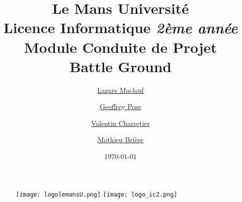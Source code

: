 \documentclass[a4paper,11pt]{article}
\begin{document}
\begin {figure}
\texttt{[image: logolemansU.png]}
\hspace{150pt} 
\texttt{[image: logo\_ic2.png]}
\end {figure}
\title {\textbf {\color {blue} Le Mans Université}\color{black}
\\  Licence Informatique  \textit {2ème année}
 \\Module Conduite de Projet
 \\ \textbf {Battle Ground }}
\author{
{\href{mailto: Lazare.Maclouf.etu@univ-lemans.fr} {Lazare Maclouf}} \and
{\href{mailto: Geoffrey.Pose.etu@univ-lemans.fr} {Geoffrey Pose}} \and
{\href{mailto: Valentin.Charretier.etu@univ-lemans.fr} {Valentin Charretier}} \and 
{\href{mailto: Mathieu.Brière.etu@univ-lemans.fr} {Mathieu Brière}}
}
\date{\today} 
\maketitle 
\newpage
\tableofcontents
\newpage
\end{document}
